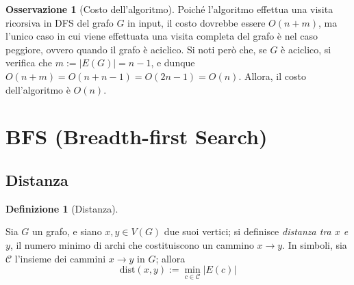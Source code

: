 \documentclass[14pt]{extreport}
\theoremstyle{definition}
\newtheorem{definition}{Definizione}[subsection]
\theoremstyle{definition}
\newtheorem{remark}{Osservazione}[subsection]
\begin{document}
\begin{remark}[Costo dell'algoritmo]
    Poiché l'algoritmo effettua una visita ricorsiva in DFS del grafo $G$ in input, il costo dovrebbe essere $O(n + m)$, ma l'unico caso in cui viene effettuata una visita completa del grafo è nel caso peggiore, ovvero quando il grafo è aciclico. Si noti però che, se $G$ è aciclico, si verifica che $m := |E(G)| = n - 1$, e dunque $O(n + m) = O(n + n - 1) = O(2n - 1) = O(n)$. Allora, il costo dell'algoritmo è $O(n)$.
\end{remark}

\section{BFS (Breadth-first Search)}

\subsection{Distanza}

\begin{definition}[Distanza]
    \label{distanza}

    Sia $G$ un grafo, e siano $x, y \in V(G)$ due suoi vertici; si definisce \textit{distanza tra $x$ e $y$}, il numero minimo di archi che costituiscono un cammino $x \rightarrow y$. In simboli, sia $\mathcal{C}$ l'insieme dei cammini $x \rightarrow y$ in $G$; allora $$\mathrm{dist}(x, y) := \min_{c \in \mathcal{C}}{\left |E(c) \right|}$$
\end{definition}
\end{document}
